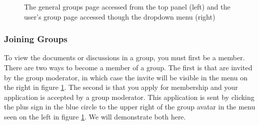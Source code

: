 \documentclass[10pt]{article}
\begin{document}
\begin{figure}[h]
    \centering
    \qquad
    \caption{The general groups page accessed from the top panel (left) and the user's group page accessed though the dropdown menu (right)}
    \label{groupmenus}
\end{figure}

\subsubsection{Joining Groups}

\begin{flushleft}
To view the documents or discussions in a group, you must first be a member.  There are two ways to become a member of a group.  The first is that are invited by the group moderator, in which case the invite will be visible in the menu on the right in figure \ref{groupmenus}.  The second is that you apply for membership and your application is accepted by a group moderator.  This application is sent by clicking the plus sign in the blue circle to the upper right of the group avatar in the menu seen on the left in figure \ref{groupmenus}.  We will demonstrate both here. 
\end{flushleft}
\end{document}
